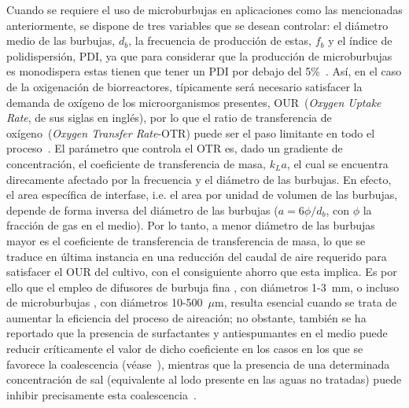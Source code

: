 Cuando se requiere el uso de microburbujas en aplicaciones como las mencionadas anteriormente, se dispone de tres variables que se desean controlar: el diámetro medio de las burbujas, $d_{b}$, la frecuencia de producción de estas, $f_{b}$ y el índice de polidispersión, PDI, ya que para considerar que la producción de microburbujas es monodispera estas tienen que tener un PDI por debajo del 5\%~\cite{Rodriguez-Rodriguez2015b}. Así, en el caso de la oxigenación de biorreactores, típicamente será necesario satisfacer la demanda de oxígeno de los microorganismos presentes, OUR~(\emph{Oxygen Uptake Rate}, de sus siglas en inglés), por lo que el ratio de transferencia de oxígeno~(\emph{Oxygen Transfer Rate}-OTR) puede ser el paso limitante en todo el proceso~\cite{Garcia-Ochoa2009}. El parámetro que controla el OTR es, dado un gradiente de concentración, el coeficiente de transferencia de masa, $k_{L}a$, el cual se encuentra direcamente afectado por la frecuencia y el diámetro de las burbujas. En efecto, el area específica de interfase, i.e. el area por unidad de volumen de las burbujas, depende de forma inversa del diámetro de las burbujas ($a = 6\phi/d_{b}$, con $\phi$ la fracción de gas en el medio). Por lo tanto, a menor diámetro de las burbujas mayor es el coeficiente de transferencia de transferencia de masa, lo que se traduce en última instancia en una reducción del caudal de aire requerido para satisfacer el OUR del cultivo, con el consiguiente ahorro que esta implica. Es por ello que el empleo de difusores de burbuja fina \cite{Sander2017,Rosso2008}, con diámetros 1-3~mm, o incluso de microburbujas \cite{Terasaka2011,Kawahara2009,Sadatomi2005}, con diámetros 10-500~$\mu$m, resulta esencial cuando se trata de aumentar la eficiencia del proceso de aireación; no obstante, también se ha reportado que la presencia de surfactantes y antiespumantes en el medio puede reducir críticamente el valor de dicho coeficiente en los casos en los que se favorece la coalescencia (véase~\cite{Garcia-Ochoa2005}), mientras que la presencia de una determinada concentración de sal (equivalente al lodo presente en las aguas no tratadas) puede inhibir precisamente esta coalescencia~\cite{Sander2017}. 

